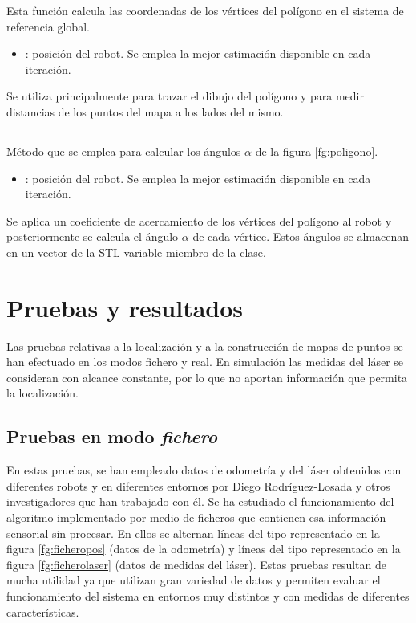 
Esta función calcula las coordenadas de los vértices del polígono en el sistema de referencia global.

\begin{itemize}
  \item {}: posición del robot. Se emplea la mejor estimación disponible en cada iteración.
\end{itemize}

Se utiliza principalmente para trazar el dibujo del polígono y para medir distancias de los puntos del mapa a los lados del mismo.
\subsection{}

\noindent
{}

Método que se emplea para calcular los ángulos $\alpha$ de la figura \ref{fg:poligono}.

\begin{itemize}
  \item {}: posición del robot. Se emplea la mejor estimación disponible en cada iteración.
\end{itemize}

Se aplica un coeficiente de acercamiento de los vértices del polígono al robot y posteriormente se calcula el ángulo $\alpha$ de cada vértice. Estos ángulos se almacenan en un vector  de la STL variable miembro de la clase.

\section{Pruebas y resultados}
Las pruebas relativas a la localización y a la construcción de mapas de puntos se han efectuado en los modos fichero y real. En simulación las medidas del láser se consideran con alcance constante, por lo que no aportan información que permita la localización.

\subsection{Pruebas en modo \emph{fichero}}
En estas pruebas, se han empleado datos de odometría y del láser obtenidos con diferentes robots y en diferentes entornos por Diego Rodríguez-Losada y otros investigadores que han trabajado con él. Se ha estudiado el funcionamiento del algoritmo implementado por medio de ficheros que contienen esa información sensorial sin procesar. En ellos se alternan líneas del tipo representado en la figura \ref{fg:ficheropos} (datos de la odometría) y líneas del tipo representado en la figura \ref{fg:ficherolaser} (datos de medidas del láser). Estas pruebas resultan de mucha utilidad ya que utilizan gran variedad de datos y permiten evaluar el funcionamiento del sistema en entornos muy distintos y con medidas de diferentes características.

